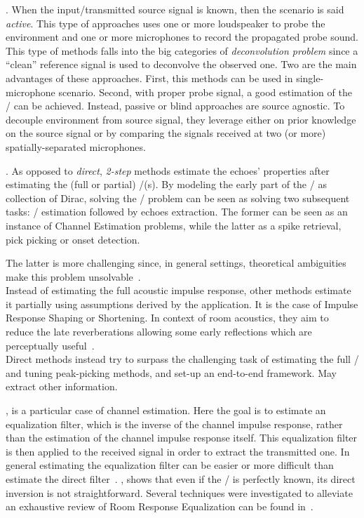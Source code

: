 .
When the input/transmitted source signal is known, then the scenario is said \textit{active}.
This type of approaches uses one or more loudspeaker to probe the environment and one or more microphones to record the propagated probe sound.
This type of methods falls into the big categories of \textit{deconvolution problem} since a ``clean'' reference signal is used to deconvolve the observed one.
Two are the main advantages of these approaches. First, this methods can be used in single-microphone scenario.
Second, with proper probe signal, a good estimation of the \RIR/ can be achieved.
Instead, passive or blind approaches are source agnostic.
To decouple environment from source signal, they leverage either on prior knowledge on the source signal or by comparing the signals received at two (or more) spatially-separated microphones.

.
As opposed to \textit{direct}, \textit{2-step} methods estimate the echoes' properties after estimating the (full or partial) \RIR/(s).
By modeling the early part of the \RIR/ as collection of Dirac, solving the \AER/ problem can be seen as solving two subsequent tasks:
\RIR/ estimation followed by echoes extraction.
The former can be seen as an instance of Channel Estimation problems, while the latter as a spike retrieval, pick picking or onset detection.

The latter is more challenging since, in general settings, theoretical ambiguities make this problem unsolvable~.
\\Instead of estimating the full acoustic impulse response, other methods estimate it partially using assumptions derived by the application.
It is the case of Impulse Response Shaping or Shortening.
In context of room acoustics, they aim to reduce the late reverberations allowing some early reflections which are perceptually useful~.
\\Direct methods instead try to surpass the challenging task of estimating the full \RIR/ and tuning peak-picking methods, and set-up an end-to-end framework.
May extract other information.

, is a particular case of channel estimation.
Here the goal is to estimate an equalization filter, which is the inverse of the channel impulse response, rather than the estimation of the channel impulse response itself.
This equalization filter is then applied to the received signal in order to extract the transmitted one.
In general estimating the equalization filter can be easier or more difficult than estimate the direct filter~.
, shows that even if the \RIR/ is perfectly known, its direct inversion is not straightforward.
Several techniques were investigated to alleviate an exhaustive review of Room Response Equalization can be found in~.

